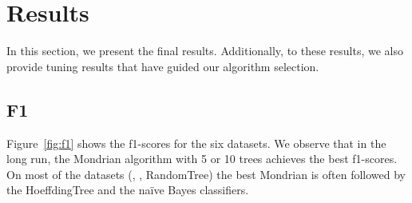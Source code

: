 \section{Results}
In this section, we present the final results. Additionally, to these results,
we also provide tuning results that have guided our algorithm selection.

\subsection{F1}
Figure~\ref{fig:f1} shows the f1-scores for the six datasets.  We observe that
in the long run, the Mondrian algorithm with 5 or 10 trees achieves the best
f1-scores.  On most of the datasets (\banosdataset, \recofitdataset,
RandomTree) the best Mondrian is often followed by the HoeffdingTree and the
naïve Bayes classifiers. 

